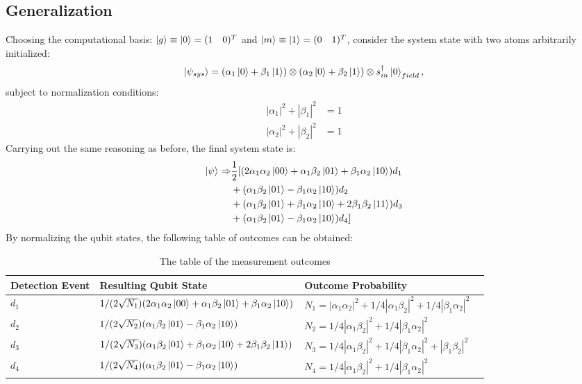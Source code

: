 \documentclass[letterpaper,10pt]{article}
\begin{document}
\subsection{Generalization}
\label{subsec:DIT_gen}
Choosing the computational basis: $\Ket{g}\equiv\Ket{0}=(1\quad 0)^T$ and $\Ket{m}\equiv\Ket{1} = (0\quad 1)^T$, consider the system state with two atoms arbitrarily initialized: 
\begin{equation*}
	\Ket{\psi_{sys}} = (\alpha_1\Ket{0}+\beta_1\Ket{1})\otimes(\alpha_2\Ket{0}+\beta_2\Ket{1})\otimes s_{in}^\dag\Ket{0}_{field},
\end{equation*}
subject to normalization conditions:
\begin{align*}
	|\alpha_1|^2+|\beta_1|^2&=1\\
	|\alpha_2|^2+|\beta_2|^2&=1	
\end{align*}
Carrying out the same reasoning as before, the final system state is:
\begin{align*}
	\Ket{\psi} \Rightarrow & 	\frac{1}{2} [(2\alpha_1\alpha_2\Ket{00}+\alpha_1\beta_2\Ket{01}+\beta_1\alpha_2\Ket{10})d_1\\
	&+(\alpha_1\beta_2\Ket{01}-\beta_1\alpha_2\Ket{10})d_2\\
	&+(\alpha_1\beta_2\Ket{01}+\beta_1\alpha_2\Ket{10}+2\beta_1\beta_2\Ket{11})d_3\\
	&+(\alpha_1\beta_2\Ket{01}-\beta_1\alpha_2\Ket{10})d_4]
\end{align*}
By normalizing the qubit states, the following table of outcomes can be obtained:
\begin{table}
\centering
\begin{tabular}{ | m{2.5cm} | m{7cm}| m{6cm} |@{}m{0pt}@{}} 
\hline
Detection Event & Resulting Qubit State & Outcome Probability & \\ [5pt] 
\hline
$d_1$ & $1/(2\sqrt{N_1})(2\alpha_1\alpha_2\Ket{00}+\alpha_1\beta_2\Ket{01}+\beta_1\alpha_2\Ket{10})$ & $N_1 = |\alpha_1\alpha_2|^2+1/4|\alpha_1\beta_2|^2+1/4|\beta_1\alpha_2|^2$ & \\[5pt]
\hline
$d_2$ & $1/(2\sqrt{N_{2}})(\alpha_1\beta_2\Ket{01}-\beta_1\alpha_2\Ket{10})$ & $N_{2} = 1/4|\alpha_1\beta_2|^2+1/4|\beta_1\alpha_2|^2$ & \\[5pt]
\hline
$d_3$ & $1/(2\sqrt{N_3})(\alpha_1\beta_2\Ket{01}+\beta_1\alpha_2\Ket{10}+2\beta_1\beta_2\Ket{11})$ & $N_3 = 1/4|\alpha_1\beta_2|^2+1/4|\beta_1\alpha_2|^2+|\beta_1\beta_2|^2$ & \\[5pt]
\hline
$d_4$ & $1/(2\sqrt{N_{4}})(\alpha_1\beta_2\Ket{01}-\beta_1\alpha_2\Ket{10})$ & $N_{4} = 1/4|\alpha_1\beta_2|^2+1/4|\beta_1\alpha_2|^2$ & \\[5pt]
\hline
\end{tabular}
\caption{The table of the measurement outcomes}
\label{tab:1}
\end{table}
\end{document}
